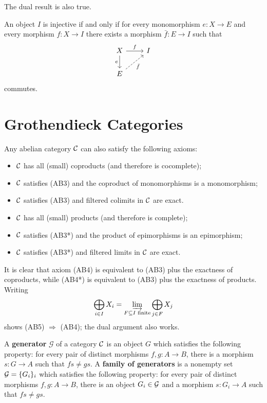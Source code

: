 The dual result is also true.

\begin{proposition}
	An object $I$ is injective if and only if for every monomorphism $e \colon X\longrightarrow E$ and every morphism $f\colon X \longrightarrow I$ there exists a morphism $\bar{f} \colon E \longrightarrow I$ such that 
	\[\begin{tikzcd}
		X & I \\
		E
		\arrow["f", from=1-1, to=1-2]
		\arrow["e"', from=1-1, to=2-1]
		\arrow["{\bar f}"', dashed, from=2-1, to=1-2]
	\end{tikzcd}\]
	commutes.
\end{proposition}








\section{Grothendieck Categories}




\begin{definition}
	Any abelian category $\mathcal{C}$ can also satisfy the following axioms:	
	\begin{itemize}
  		\item[(AB3)] $\mathcal{C}$ has all (small) coproducts (and therefore is cocomplete);
    	\item[(AB4)] $\mathcal{C}$ satisfies (AB3) and the coproduct of monomorphisms is a monomorphism; 
    	\item[(AB5)] $\mathcal{C}$ satisfies (AB3) and filtered colimits in $\mathcal{C}$ are exact.
    	\item[(AB3*)] $\mathcal{C}$ has all (small) products (and therefore is complete);
    	\item[(AB4*)] $\mathcal{C}$ satisfies (AB3*) and the product of epimorphisms is an epimorphism; 
    	\item[(AB5*)] $\mathcal{C}$ satisfies (AB3*) and filtered limits in $\mathcal{C}$ are exact.  
	\end{itemize}
\end{definition}

It is clear that axiom (AB4) is equivalent to (AB3) plus the exactness of coproducts, while (AB4*) is equivalent to (AB3) plus the exactness of products. Writing
\[ \bigoplus_{i\in I} X_i = \varinjlim_{F \subseteq I \text{ finite}} \bigoplus_{j\in F} X_j\]
shows (AB5) $\Rightarrow$ (AB4); the dual argument also works.

\begin{definition}
	A \textbf{generator} $\mathcal{G}$ of a category $\mathcal{C}$ is an object $G$ which satisfies the following property: for every pair of distinct morphisms $f,g: A \longrightarrow B$, there is a morphism $s\colon G \longrightarrow A$ such that $fs\neq gs$. A \textbf{family of generators} is a nonempty set $\mathcal{G}=\{G_i\}_i$ which satisfies the following property: for every pair of distinct morphisms $f,g: A \longrightarrow B$, there is an object $G_i  \in \mathcal{G}$ and a morphism $s\colon G_i \longrightarrow A$ such that $fs\neq gs$.
\end{definition}

